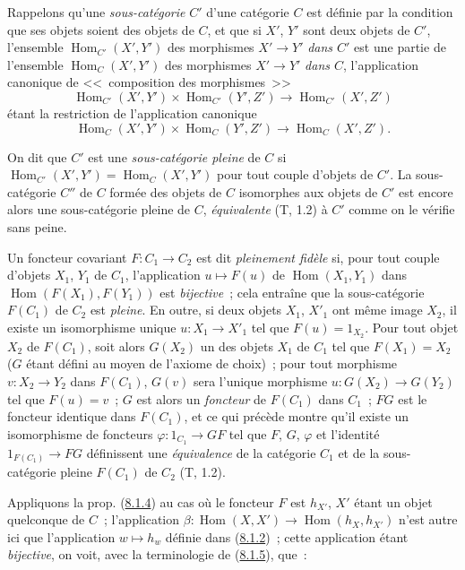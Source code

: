 \begin{env}[8.1.5]
\label{0.8.1.5-fr}
Rappelons qu'une \emph{sous-catégorie} $C'$ d'une catégorie $C$ est définie
par la condition que ses objets soient des objets de $C$, et que si $X'$,
$Y'$ sont deux objets de $C'$, l'ensemble
$\operatorname{Hom}_{C'}(X',Y')$ des morphismes $X'\to Y'$ \emph{dans
$C'$} est une partie de l'ensemble $\operatorname{Hom}_C(X',Y')$ des
morphismes $X'\to Y'$ \emph{dans $C$}, l'application canonique de
<<~composition des morphismes~>>
\[
  \operatorname{Hom}_{C'}(X',Y')\times\operatorname{Hom}_{C'}(Y',Z')
  \to\operatorname{Hom}_{C'}(X',Z')
\]
étant la restriction de l'application canonique
\[
  \operatorname{Hom}_C(X',Y')\times\operatorname{Hom}_C(Y',Z')
  \to\operatorname{Hom}_C(X',Z').
\]

On dit que $C'$ est une \emph{sous-catégorie pleine} de $C$ si
$\operatorname{Hom}_{C'}(X',Y')=\operatorname{Hom}_C(X',Y')$ pour tout
couple d'objets de $C'$. La sous-catégorie $C''$ de $C$ formée des objets de
$C$ isomorphes aux objets de $C'$ est encore alors une sous-catégorie pleine
de $C$, \emph{équivalente} (T, 1.2) à $C'$ comme on le vérifie sans peine.

Un foncteur covariant $F:C_1\to C_2$ est dit \emph{pleinement fidèle} si,
pour tout couple d'objets $X_1$, $Y_1$ de $C_1$, l'application
$u\mapsto F(u)$ de $\operatorname{Hom}(X_1,Y_1)$ dans
$\operatorname{Hom}(F(X_1),F(Y_1))$ est \emph{bijective}~; cela entraîne que
la sous-catégorie $F(C_1)$ de $C_2$ est \emph{pleine}. En outre, si deux
objets $X_1$, $X'_1$ ont même image $X_2$, il existe un isomorphisme unique
$u:X_1\to X'_1$ tel que $F(u)=1_{X_2}$. Pour tout objet $X_2$ de $F(C_1)$,
soit alors $G(X_2)$ un des objets $X_1$ de $C_1$ tel que $F(X_1)=X_2$
($G$ étant défini au moyen de l'axiome de choix)~; pour tout morphisme
$v:X_2\to Y_2$ dans $F(C_1)$, $G(v)$ sera l'unique morphisme
$u:G(X_2)\to G(Y_2)$ tel que $F(u)=v$~; $G$ est alors un \emph{foncteur} de
$F(C_1)$ dans $C_1$~; $FG$ est le foncteur identique dans $F(C_1)$, et ce
qui précède montre qu'il existe un isomorphisme de foncteurs
$\varphi:1_{C_1}\to GF$ tel que $F$, $G$, $\varphi$ et l'identité
$1_{F(C_1)}\to FG$ définissent une \emph{équivalence} de la catégorie $C_1$
et de la sous-catégorie pleine $F(C_1)$ de $C_2$ (T, 1.2).
\end{env}

\begin{env}[8.1.6]
\label{0.8.1.6-fr}
Appliquons la prop. (\hyperref[0.8.1.4-fr]{8.1.4}) au cas où le foncteur $F$
est $h_{X'}$, $X'$ étant un objet quelconque de $C$~; l'application
$\beta:\operatorname{Hom}(X,X')\to\operatorname{Hom}(h_X,h_{X'})$ n'est
autre ici que l'application $w\mapsto h_w$ définie dans
(\hyperref[0.8.1.2-fr]{8.1.2})~; cette application étant \emph{bijective},
on voit, avec la terminologie de (\hyperref[0.8.1.5-fr]{8.1.5}), que~:
\end{env}

